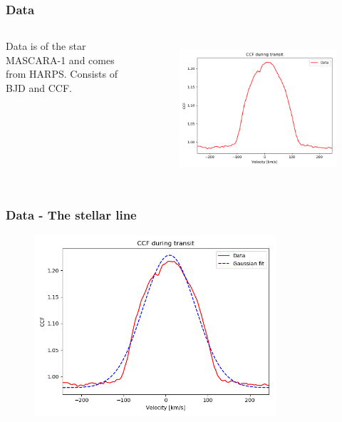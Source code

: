 \documentclass[show notes]{beamer}
\begin{document}
\begin{frame}
\frametitle{Data}
\begin{columns}
	Data is of the star MASCARA-1 and comes from HARPS.
	\vspace{0.5cm}
	Consists of BJD and CCF.
	
	\begin{figure}
		\centering
		\includegraphics[width=\textwidth]{../figures/CCF_it.png}
		\label{fig:CCF_it}
	\end{figure}	
\end{columns}
\end{frame}

\begin{frame}
\frametitle{Data - The stellar line}
\begin{figure}
	\centering
	\includegraphics[width=0.8\textwidth]{../figures/CCF_it_fit.png}
	\label{fig:CCF_fit}
\end{figure}
\end{frame}
\end{document}
